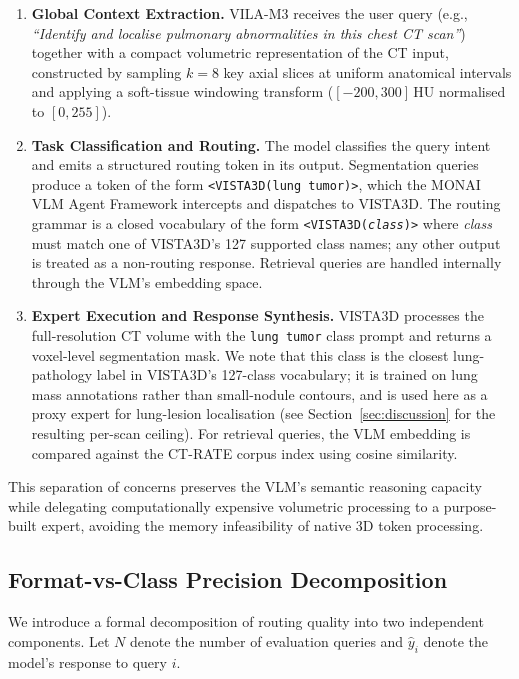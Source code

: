 \documentclass[lineno,referee,pdflatex,sn-mathphys-num]{sn-jnl}
\begin{document}
\begin{enumerate}
  \item \textbf{Global Context Extraction.} VILA-M3 receives the user
    query (e.g., \textit{``Identify and localise pulmonary abnormalities
    in this chest CT scan''}) together with a compact volumetric
    representation of the CT input, constructed by sampling $k=8$ key
    axial slices at uniform anatomical intervals and applying a soft-tissue
    windowing transform ($[-200, 300]$\,HU normalised to $[0, 255]$).

  \item \textbf{Task Classification and Routing.} The model classifies the
    query intent and emits a structured routing token in its output.
    Segmentation queries produce a token of the form
    \texttt{<VISTA3D(lung tumor)>}, which the MONAI VLM Agent Framework
    intercepts and dispatches to VISTA3D. The routing grammar is a
    closed vocabulary of the form \texttt{<VISTA3D(\textit{class})>}
    where \textit{class} must match one of VISTA3D's 127 supported class
    names; any other output is treated as a non-routing response.
    Retrieval queries are handled internally through the VLM's embedding
    space.

  \item \textbf{Expert Execution and Response Synthesis.} VISTA3D
    processes the full-resolution CT volume with the \texttt{lung tumor}
    class prompt and returns a voxel-level segmentation mask. We note
    that this class is the closest lung-pathology label in VISTA3D's
    127-class vocabulary; it is trained on lung mass annotations rather
    than small-nodule contours, and is used here as a proxy expert for
    lung-lesion localisation (see Section~\ref{sec:discussion} for the
    resulting per-scan ceiling). For retrieval queries, the VLM embedding
    is compared against the CT-RATE corpus index using cosine similarity.
\end{enumerate}

This separation of concerns preserves the VLM's semantic reasoning
capacity while delegating computationally expensive volumetric processing
to a purpose-built expert, avoiding the memory infeasibility of native
3D token processing.

\subsection{Format-vs-Class Precision Decomposition}
\label{sec:decomp}

We introduce a formal decomposition of routing quality into two
independent components. Let $N$ denote the number of evaluation queries
and $\hat{y}_i$ denote the model's response to query $i$.
\end{document}
